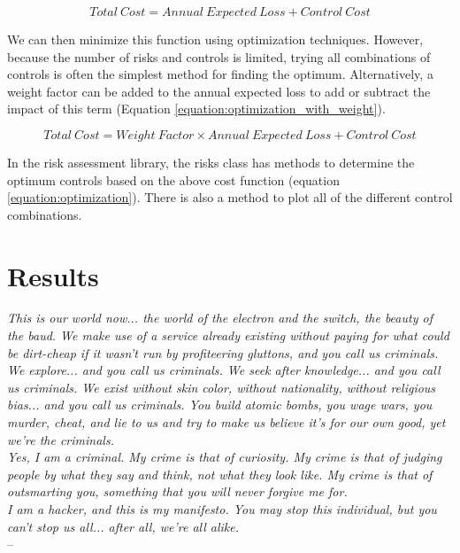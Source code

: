 \documentclass{article}
\begin{document}
\begin{equation}
    Total\ Cost = Annual\ Expected\ Loss + Control\ Cost
    \label{equation:optimization}
\end{equation}

We can then minimize this function using optimization techniques. However, because the number of risks and controls is limited, trying all combinations of controls is often the simplest method for finding the optimum. Alternatively, a weight factor can be added to the annual expected loss to add or subtract the impact of this term (Equation \ref{equation:optimization_with_weight}).

\begin{equation}
    Total\ Cost = Weight\ Factor \times Annual\ Expected\ Loss + Control\ Cost
    \label{equation:optimization_with_weight}
\end{equation}

In the risk assessment library, the risks class has methods to determine the optimum controls based on the above cost function (equation \ref{equation:optimization}). There is also a method to plot all of the different control combinations.
\newpage
\section{Results}

\begin{mdframed}
    \emph{This is our world now... the world of the electron and the switch, the beauty of the baud. We make use of a service already existing without paying for what could be dirt-cheap if it wasn't run by profiteering gluttons, and you call us criminals. We explore... and you call us criminals. We seek after knowledge... and you call us criminals. We exist without skin color, without nationality, without religious bias... and you call us criminals. You build atomic bombs, you wage wars, you murder, cheat, and lie to us and try to make us believe it's for our own good, yet we're the criminals.} \\
    \emph{\indent Yes, I am a criminal. My crime is that of curiosity. My crime is that of judging people by what they say and think, not what they look like. My crime is that of outsmarting you, something that you will never forgive me for.} \\
    \emph{\indent I am a hacker, and this is my manifesto. You may stop this individual, but you can't stop us all... after all, we're all alike.} \\ -- \cite{the_mentor_conscience_1986}
\end{mdframed}
\end{document}
